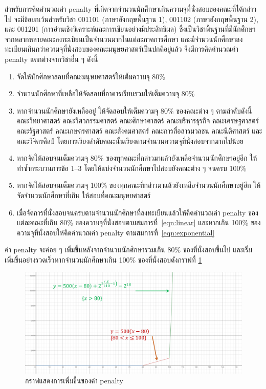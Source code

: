 สำหรับการคิดคำนวณค่า penalty ที่เกิดจากจำนวนนักศึกษาเกินความจุที่นั่งสอบของคณะที่ได้กล่าวไป จะมีข้อยกเว้นสำหรับวิชา 001101 (ภาษาอังกฤษพื้นฐาน 1), 001102 (ภาษาอังกฤษพื้นฐาน 2), และ 001201 (การอ่านเชิงวิเคราะห์และการเขียนอย่างมีประสิทธิผล)
ซึ่งเป็นวิชาพื้นฐานที่มีนักศึกษาจากหลากหลายคณะลงทะเบียนเป็นจำนวนมากในแต่ละภาคการศึกษา และมีจำนวนนักศึกษาลงทะเบียนเกินกว่าความจุที่นั่งสอบของคณะมนุษยศาสตร์เป็นปกติอยู่แล้ว จึงมีการคิดคำนวณค่า penalty แตกต่างจากวิชาอื่น ๆ ดังนี้

\begin{enumerate}
    \item จัดให้นักศึกษาสอบที่คณะมนุษยศาสตร์ให้เต็มความจุ 80\% 
    \item จำนวนนักศึกษาที่เหลือให้จัดสอบที่อาคารเรียนรวมให้เต็มความจุ 80\% 
    \item หากจำนวนนักศึกษายังเหลืออยู่ ให้จัดสอบให้เต็มความจุ 80\% ของคณะต่าง ๆ ตามลำดับดังนี้ คณะวิทยาศาสตร์ คณะวิศวกรรมศาสตร์ คณะศึกษาศาสตร์ คณะบริหารธุรกิจ คณะเศรษฐศาสตร์ คณะรัฐศาสตร์ คณะเกษตรศาสตร์ คณะสังคมศาสตร์ คณะการสื่อสารมวลชน คณะนิติศาสตร์ และคณะวิจิตรศิลป์
    โดยการเรียงลำดับคณะนั้นเรียงตามจำนวนความจุที่นั่งสอบจากมากไปน้อย 
    \item หากจัดให้สอบจนเต็มความจุ 80\% ของทุกคณะที่กล่าวมาแล้วยังเหลือจำนวนนักศึกษาอยู่อีก ให้ทำซ้ำกระบวนการข้อ 1--3 โดยให้แบ่งจำนวนนักศึกษาไปสอบยังคณะต่าง ๆ จนครบ 100\%
    \item หากจัดให้สอบจนเต็มความจุ 100\% ของทุกคณะที่กล่าวมาแล้วยังเหลือจำนวนนักศึกษาอยู่อีก ให้จัดจำนวนนักศึกษาที่เกิน ให้สอบที่คณะมนุษยศาสตร์
    \item เมื่อจัดการที่นั่งสอบจนครบตามจำนวนนักศึกษาที่ลงทะเบียนแล้วให้คิดคำนวณค่า penalty ของแต่ละคณะที่เกิน 80\% ของความจุที่นั่งสอบตามสมการที่~\ref{eqn:linear} และหากเกิน 100\% ของความจุที่นั่งสอบให้คิดคำนวณค่า penalty ตามสมการที่~\ref{eqn:exponential}
\end{enumerate}
ค่า penalty จะค่อย ๆ เพิ่มขึ้นหลังจากจำนวนนักศึกษารวมเกิน 80\% ของที่นั่งสอบขึ้นไป และเริ่มเพิ่มขึ้นอย่างรวดเร็วหากจำนวนนักศึกษาเกิน 100\% ของที่นั่งสอบดังกราฟที่ \ref{fig:penalty_graph}

\begin{figure}
    \begin{center}
      \includegraphics[width=\linewidth]{images/penalty_graph.png}
    \end{center}
    \caption[กราฟแสดงการเพิ่มขึ้นของค่า penalty]{กราฟแสดงการเพิ่มขึ้นของค่า penalty}
    \label{fig:penalty_graph}     
\end{figure}


